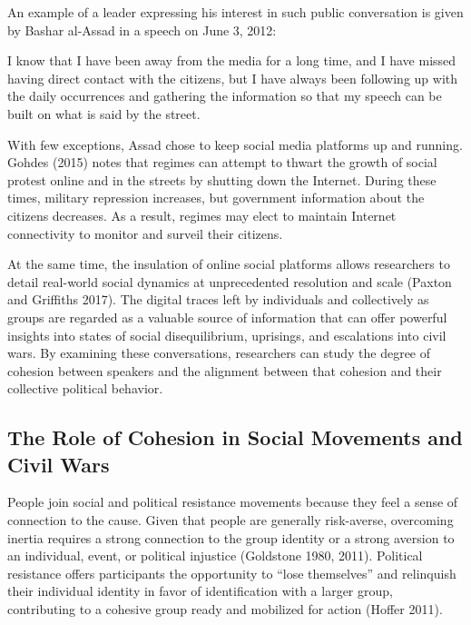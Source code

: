 \documentclass[
  english,
  man]{apa6}
\begin{document}
An example of a leader expressing his interest in such public
conversation is given by Bashar al-Assad in a speech on June 3, 2012:

\begin{singlespace}
\setlength{\leftskip}{1cm}

\noindent I know that I have been away from the media for a long time, and I
have missed having direct contact with the citizens, but I have always been
following up with the daily occurrences and gathering the information so that my
speech can be built on what is said by the street.

\setlength{\leftskip}{0pt}
\end{singlespace}

\noindent With few exceptions, Assad chose to keep social media platforms up and
running. Gohdes (2015) notes that regimes can attempt to thwart
the growth of social protest online and in the streets by shutting down the
Internet. During these times, military repression increases, but government
information about the citizens decreases. As a result, regimes may elect to
maintain Internet connectivity to monitor and surveil their citizens.

At the same time, the insulation of online social platforms allows researchers
to detail real-world social dynamics at unprecedented resolution and scale
(Paxton and Griffiths 2017). The digital traces left by individuals and collectively as
groups are regarded as a valuable source of information that can offer powerful
insights into states of social disequilibrium, uprisings, and escalations into
civil wars. By examining these conversations, researchers can study the degree
of cohesion between speakers and the alignment between that cohesion and their
collective political behavior.

\hypertarget{the-role-of-cohesion-in-social-movements-and-civil-wars}{%
\subsection{The Role of Cohesion in Social Movements and Civil Wars}\label{the-role-of-cohesion-in-social-movements-and-civil-wars}}

People join social and political resistance movements because they feel a sense
of connection to the cause. Given that people are generally risk-averse,
overcoming inertia requires a strong connection to the group identity or a
strong aversion to an individual, event, or political injustice
(Goldstone 1980, 2011). Political resistance offers participants the
opportunity to \enquote{lose themselves} and relinquish their individual identity in
favor of identification with a larger group, contributing to a cohesive group
ready and mobilized for action (Hoffer 2011).
\end{document}

